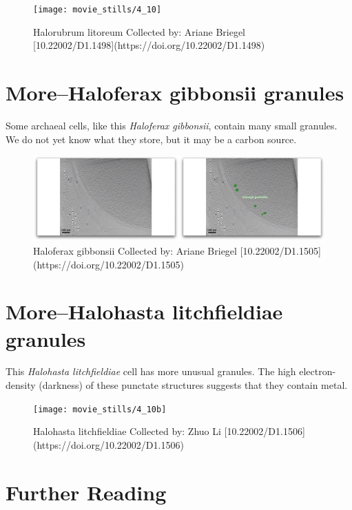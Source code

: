 \documentclass[]{tufte-book}
\begin{document}
\begin{figure}
\texttt{[image: movie\_stills/4\_10]} \caption[Halorubrum litoreum Collected by]{Halorubrum litoreum Collected by: Ariane Briegel [10.22002/D1.1498](https://doi.org/10.22002/D1.1498)}\label{fig:unnamed-chunk-77}
\end{figure}

\hypertarget{morehaloferax-gibbonsii-granules}{\section{More--Haloferax
gibbonsii granules}\label{morehaloferax-gibbonsii-granules}}

Some archaeal cells, like this \emph{Haloferax gibbonsii}, contain many
small granules. We do not yet know what they store, but it may be a
carbon source.

\begin{figure}
\includegraphics{movie_stills/4_10a} \caption[Haloferax gibbonsii Collected by]{Haloferax gibbonsii Collected by: Ariane Briegel [10.22002/D1.1505](https://doi.org/10.22002/D1.1505)}\label{fig:unnamed-chunk-78}
\end{figure}

\hypertarget{morehalohasta-litchfieldiae-granules}{\section{More--Halohasta
litchfieldiae granules}\label{morehalohasta-litchfieldiae-granules}}

This \emph{Halohasta litchfieldiae} cell has more unusual granules. The
high electron-density (darkness) of these punctate structures suggests
that they contain metal.

\begin{figure}
\texttt{[image: movie\_stills/4\_10b]} \caption[Halohasta litchfieldiae Collected by]{Halohasta litchfieldiae Collected by: Zhuo Li [10.22002/D1.1506](https://doi.org/10.22002/D1.1506)}\label{fig:unnamed-chunk-79}
\end{figure}

\section{Further Reading}\label{further-reading-3}
\end{document}

